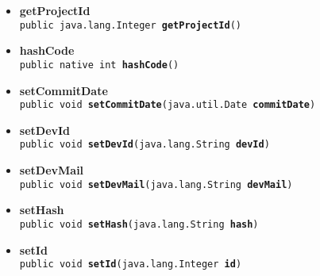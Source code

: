 {{{\begin{itemize}
{}%
\item{ 
\hypertarget{it.unisa.sesa.repominer.db.entities.Change.getProjectId()}{{\bf  getProjectId}\\}
\texttt{public java.lang.Integer\ {\bf  getProjectId}()
\label{it.unisa.sesa.repominer.db.entities.Change.getProjectId()}}%
}%
\item{ 
\hypertarget{it.unisa.sesa.repominer.db.entities.Change.hashCode()}{{\bf  hashCode}\\}
\texttt{public native int\ {\bf  hashCode}()
\label{it.unisa.sesa.repominer.db.entities.Change.hashCode()}}%
}%
\item{ 
\hypertarget{it.unisa.sesa.repominer.db.entities.Change.setCommitDate(java.util.Date)}{{\bf  setCommitDate}\\}
\texttt{public void\ {\bf  setCommitDate}(\texttt{java.util.Date} {\bf  commitDate})
\label{it.unisa.sesa.repominer.db.entities.Change.setCommitDate(java.util.Date)}}%
}%
\item{ 
\hypertarget{it.unisa.sesa.repominer.db.entities.Change.setDevId(java.lang.String)}{{\bf  setDevId}\\}
\texttt{public void\ {\bf  setDevId}(\texttt{java.lang.String} {\bf  devId})
\label{it.unisa.sesa.repominer.db.entities.Change.setDevId(java.lang.String)}}%
}%
\item{ 
\hypertarget{it.unisa.sesa.repominer.db.entities.Change.setDevMail(java.lang.String)}{{\bf  setDevMail}\\}
\texttt{public void\ {\bf  setDevMail}(\texttt{java.lang.String} {\bf  devMail})
\label{it.unisa.sesa.repominer.db.entities.Change.setDevMail(java.lang.String)}}%
}%
\item{ 
\hypertarget{it.unisa.sesa.repominer.db.entities.Change.setHash(java.lang.String)}{{\bf  setHash}\\}
\texttt{public void\ {\bf  setHash}(\texttt{java.lang.String} {\bf  hash})
\label{it.unisa.sesa.repominer.db.entities.Change.setHash(java.lang.String)}}%
}%
\item{ 
\hypertarget{it.unisa.sesa.repominer.db.entities.Change.setId(java.lang.Integer)}{{\bf  setId}\\}
\texttt{public void\ {\bf  setId}(\texttt{java.lang.Integer} {\bf  id})
\label{it.unisa.sesa.repominer.db.entities.Change.setId(java.lang.Integer)}}%
}
\end{itemize}}}}
